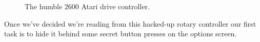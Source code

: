 \begin{figure}[H]
    \centering
    \begin{adjustbox}{width=4cm,center}
    \end{adjustbox}
\caption*{The humble 2600 Atari drive controller.}
\end{figure}

Once we've decided we're reading from this hacked-up rotary controller our first task is to hide it
behind some secret button presses on the options screen.

